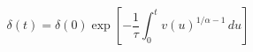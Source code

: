 \documentclass{article}
\begin{document}
\fontsize{22}{29}\selectfont
\[
\delta(t)=\delta(0)\exp\left[-\frac1\tau\int_0^t v(u)^{1/\alpha-1}\,du\right]
\]
\end{document}
